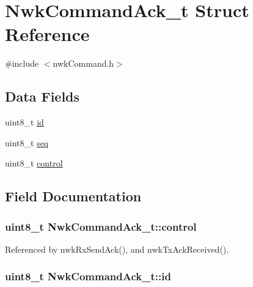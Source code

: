 \hypertarget{struct_nwk_command_ack__t}{\section{Nwk\-Command\-Ack\-\_\-t Struct Reference}
\label{struct_nwk_command_ack__t}
}


{\ttfamily \#include $<$nwk\-Command.\-h$>$}

\subsection*{Data Fields}
\begin{DoxyCompactItemize}
\item 
uint8\-\_\-t \hyperlink{struct_nwk_command_ack__t_a6c633bba976a209e42161d49b2d9b1a7}{id}
\item 
uint8\-\_\-t \hyperlink{struct_nwk_command_ack__t_a0accb86a272cf69bb4358b18977bf373}{seq}
\item 
uint8\-\_\-t \hyperlink{struct_nwk_command_ack__t_a26cf3618207855411e55d3b26990ed33}{control}
\end{DoxyCompactItemize}


\subsection{Field Documentation}
\hypertarget{struct_nwk_command_ack__t_a26cf3618207855411e55d3b26990ed33}{
\subsubsection[{control}]{\setlength{\rightskip}{0pt plus 5cm}uint8\-\_\-t Nwk\-Command\-Ack\-\_\-t\-::control}}\label{struct_nwk_command_ack__t_a26cf3618207855411e55d3b26990ed33}


Referenced by nwk\-Rx\-Send\-Ack(), and nwk\-Tx\-Ack\-Received().

\hypertarget{struct_nwk_command_ack__t_a6c633bba976a209e42161d49b2d9b1a7}{
\subsubsection[{id}]{\setlength{\rightskip}{0pt plus 5cm}uint8\-\_\-t Nwk\-Command\-Ack\-\_\-t\-::id}}\label{struct_nwk_command_ack__t_a6c633bba976a209e42161d49b2d9b1a7}


